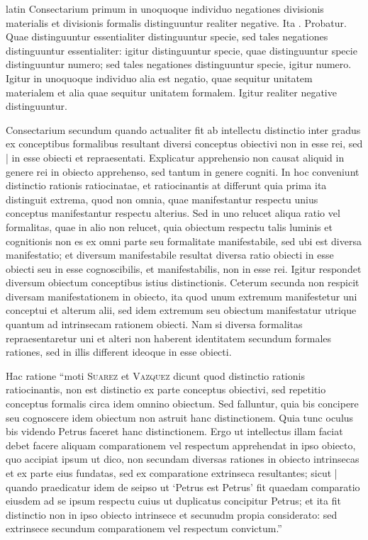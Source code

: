 \begin{otherlanguage*}{latin}
\pstart
Consectarium primum in unoquoque individuo negationes divisionis materialis et divisionis formalis distinguuntur realiter negative. Ita . Probatur. Quae distinguuntur essentialiter distinguuntur specie, sed tales negationes distinguuntur essentialiter:
igitur distinguuntur specie, quae distinguuntur specie distinguuntur numero; sed tales negationes distinguuntur specie, igitur numero. Igitur in unoquoque individuo alia est negatio, quae sequitur unitatem materialem et alia quae sequitur unitatem formalem. Igitur realiter negative distinguuntur. 
\pend

\pstart
Consectarium secundum quando actualiter fit ab intellectu distinctio inter gradus ex conceptibus formalibus resultant diversi conceptus obiectivi non in esse rei, sed \textnormal{|} in esse obiecti et repraesentati. Explicatur apprehensio non causat aliquid in genere rei in obiecto apprehenso, sed tantum in genere cogniti. In hoc conveniunt distinctio rationis ratiocinatae, et ratiocinantis at differunt quia prima ita distinguit extrema, quod non omnia, quae manifestantur respectu unius conceptus manifestantur respectu alterius. Sed in uno relucet aliqua ratio vel formalitas, quae in alio non relucet, quia obiectum respectu talis luminis et cognitionis non es ex omni parte seu formalitate manifestabile, sed ubi est diversa manifestatio; et diversum manifestabile resultat diversa ratio obiecti in esse obiecti seu in esse cognoscibilis, et manifestabilis, non in esse rei. Igitur respondet diversum obiectum conceptibus istius distinctionis. Ceterum secunda non respicit diversam manifestationem in obiecto, ita quod unum extremum manifestetur uni conceptui et alterum alii, sed idem extremum seu obiectum manifestatur utrique quantum ad intrinsecam rationem obiecti. Nam si diversa formalitas repraesentaretur uni et alteri non haberent identitatem secundum formales rationes, sed in illis different ideoque in esse obiecti. 
\pend

\pstart
Hac ratione \enquote{moti \textsc{Suarez} et \textsc{Vazquez} dicunt quod distinctio rationis ratiocinantis, non est distinctio ex parte conceptus obiectivi, sed repetitio conceptus formalis circa idem omnino obiectum. Sed falluntur, quia bis concipere seu cognoscere idem obiectum non astruit hanc distinctionem. Quia tunc oculus bis videndo Petrus faceret hanc distinctionem. Ergo ut intellectus illam faciat debet facere aliquam comparationem vel respectum apprehendat in ipso obiecto, quo accipiat ipsum ut dico, non secundam diversas rationes in obiecto intrinsecas et ex parte eius fundatas, sed ex comparatione extrinseca resultantes; sicut \textnormal{|} quando praedicatur idem de seipso ut `Petrus est Petrus' fit quaedam comparatio eiusdem ad se ipsum respectu cuius ut duplicatus concipitur Petrus; et ita fit distinctio non in ipso obiecto intrinsece et secunudm propia considerato:
sed extrinsece secundum comparationem vel respectum convictum.} 
\pend


\end{otherlanguage*}
